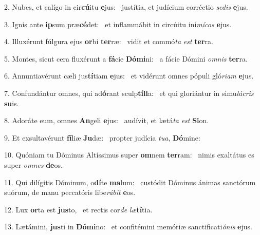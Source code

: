 2. Nubes, et calígo in cir\textbf{cú}itu \textbf{e}jus: \ast\  justítia, et judícium corréctio \textit{se}\textit{dis} \textbf{e}jus.\

3. Ignis ante \textbf{ip}sum præ\textbf{cé}det: \ast\  et inflammábit in circúitu ini\textit{mí}\textit{cos} \textbf{e}jus.\

4. Illuxérunt fúlgura ejus \textbf{or}bi \textbf{ter}ræ: \ast\  vidit et commó\textit{ta} \textit{est} \textbf{ter}ra.\

5. Montes, sicut cera fluxérunt a \textbf{fá}cie \textbf{Dó}\textbf{mi}ni: \ast\  a fácie Dómini \textit{om}\textit{nis} \textbf{ter}ra.\

6. Annuntiavérunt cæli jus\textbf{tí}tiam \textbf{e}jus: \ast\  et vidérunt omnes pópuli gló\textit{ri}\textit{am} \textbf{e}jus.\

7. Confundántur omnes, qui ad\textbf{ó}rant sculp\textbf{tí}\textbf{li}a: \ast\  et qui gloriántur in simu\textit{lá}\textit{cris} \textbf{su}is.\

8. Adoráte eum, omnes \textbf{An}geli \textbf{e}jus: \ast\  audívit, et lætá\textit{ta} \textit{est} \textbf{Si}on.\

9. Et exsultavérunt \textbf{fí}liæ \textbf{Ju}dæ: \ast\  propter judícia \textit{tu}\textit{a}, \textbf{Dó}mine:\

10. Quóniam tu Dóminus Altíssimus super \textbf{om}nem \textbf{ter}ram: \ast\  nimis exaltátus es super \textit{om}\textit{nes} \textbf{de}os.\

11. Qui dilígitis Dóminum, o\textbf{dí}te \textbf{ma}lum: \ast\  custódit Dóminus ánimas sanctórum suórum, de manu peccatóris libe\textit{rá}\textit{bit} \textbf{e}os.\

12. Lux \textbf{or}ta est \textbf{jus}to, \ast\  et rectis cor\textit{de} \textit{læ}\textbf{tí}tia.\

13. Lætámini, \textbf{jus}ti in \textbf{Dó}\textbf{mi}no: \ast\  et confitémini memóriæ sanctificati\textit{ó}\textit{nis} \textbf{e}jus.\

